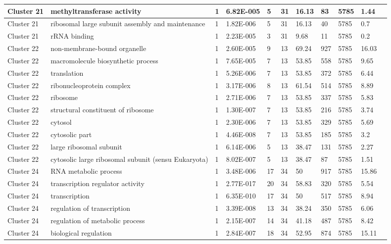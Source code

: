 \begin{tabular}{|l|l|l|l|l|l|l|l|l|l|l|}
\hline
Cluster 21&methyltransferase activity&1&6.82E-005&5&31&16.13&83&5785&1.44&\\
\hline
Cluster 21&ribosomal large subunit assembly and maintenance&1&1.82E-006&5&31&16.13&40&5785&0.7&\\
\hline
Cluster 21&rRNA binding&1&2.23E-005&3&31&9.68&11&5785&0.2&\\
\hline
Cluster 22&non-membrane-bound organelle&1&2.60E-005&9&13&69.24&927&5785&16.03&\\
\hline
Cluster 22&macromolecule biosynthetic process&1&7.65E-005&7&13&53.85&558&5785&9.65&\\
\hline
Cluster 22&translation&1&5.26E-006&7&13&53.85&372&5785&6.44&\\
\hline
Cluster 22&ribonucleoprotein complex&1&3.17E-006&8&13&61.54&514&5785&8.89&\\
\hline
Cluster 22&ribosome&1&2.71E-006&7&13&53.85&337&5785&5.83&\\
\hline
Cluster 22&structural constituent of ribosome&1&1.30E-007&7&13&53.85&216&5785&3.74&\\
\hline
Cluster 22&cytosol&1&2.30E-006&7&13&53.85&329&5785&5.69&\\
\hline
Cluster 22&cytosolic part&1&4.46E-008&7&13&53.85&185&5785&3.2&\\
\hline
Cluster 22&large ribosomal subunit&1&6.14E-006&5&13&38.47&131&5785&2.27&\\
\hline
Cluster 22&cytosolic large ribosomal subunit (sensu Eukaryota)&1&8.02E-007&5&13&38.47&87&5785&1.51&\\
\hline
Cluster 24&RNA metabolic process&1&3.48E-006&17&34&50&917&5785&15.86&\\
\hline
Cluster 24&transcription regulator activity&1&2.77E-017&20&34&58.83&320&5785&5.54&\\
\hline
Cluster 24&transcription&1&6.35E-010&17&34&50&517&5785&8.94&\\
\hline
Cluster 24&regulation of transcription&1&3.39E-008&13&34&38.24&350&5785&6.06&\\
\hline
Cluster 24&regulation of metabolic process&1&2.15E-007&14&34&41.18&487&5785&8.42&\\
\hline
Cluster 24&biological regulation&1&2.84E-007&18&34&52.95&874&5785&15.11&\\
\hline
\end{tabular}
